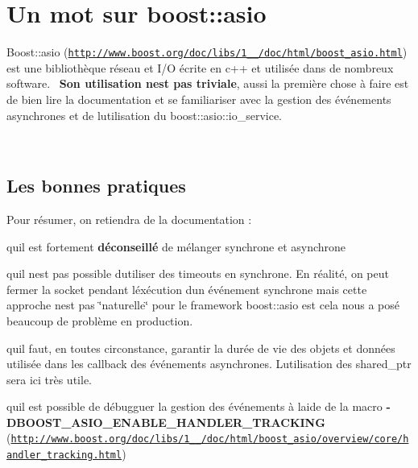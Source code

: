  \hypertarget{index_sec_boost}{}\section{Un mot sur boost\+::asio}\label{index_sec_boost}




Boost\+::asio (\href{http://www.boost.org/doc/libs/1_48_0/doc/html/boost_asio.html}{\tt http\+://www.\+boost.\+org/doc/libs/1\+\_\+\_/doc/html/boost\+\_\+asio.\+html}) est une bibliothèque réseau et I/O écrite en c++ et utilisée dans de nombreux software.~\newline
 {\bfseries Son utilisation n\textquotesingle{}est pas triviale}, aussi la première chose à faire est de bien lire la documentation et se familiariser avec la gestion des événements asynchrones et de l\textquotesingle{}utilisation du boost\+::asio\+::io\+\_\+service.~\newline


~\newline
 \hypertarget{index_ssec_boost_practice}{}\subsection{Les bonnes pratiques}\label{index_ssec_boost_practice}
Pour résumer, on retiendra de la documentation \+:


\begin{DoxyEnumerate}
\item qu\textquotesingle{}il est fortement {\bfseries déconseillé} de mélanger synchrone et asynchrone
\item qu\textquotesingle{}il n\textquotesingle{}est pas possible d\textquotesingle{}utiliser des timeouts en synchrone. En réalité, on peut fermer la socket pendant l\textquotesingle{}éxécution d\textquotesingle{}un événement synchrone mais cette approche n\textquotesingle{}est pas \char`\"{}naturelle\char`\"{} pour le framework boost\+::asio est cela nous a posé beaucoup de problème en production.
\item qu\textquotesingle{}il faut, en toutes circonstance, garantir la durée de vie des objets et données utilisée dans les callback des événements asynchrones. L\textquotesingle{}utilisation des shared\+\_\+ptr sera ici très utile.
\item qu\textquotesingle{}il est possible de débugguer la gestion des événements à l\textquotesingle{}aide de la macro {\bfseries -\/\+D\+B\+O\+O\+S\+T\+\_\+\+A\+S\+I\+O\+\_\+\+E\+N\+A\+B\+L\+E\+\_\+\+H\+A\+N\+D\+L\+E\+R\+\_\+\+T\+R\+A\+C\+K\+I\+NG} (\href{http://www.boost.org/doc/libs/1_48_0/doc/html/boost_asio/overview/core/handler_tracking.html}{\tt http\+://www.\+boost.\+org/doc/libs/1\+\_\+\_/doc/html/boost\+\_\+asio/overview/core/handler\+\_\+tracking.\+html})
\end{DoxyEnumerate}

